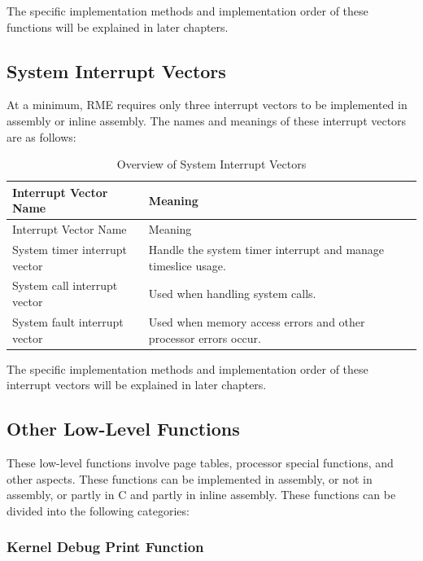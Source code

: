The specific implementation methods and implementation order of these functions will be explained in later chapters.

\subsection{System Interrupt Vectors}\label{subsec:7-system-interrupt-vectors}

At a minimum, RME requires only three interrupt vectors to be implemented in assembly or inline assembly. The names and meanings of these interrupt vectors are as follows:

\begin{xltabular}{\textwidth}{@{}>{\hsize\raggedright\arraybackslash}X>{\hsize\raggedright\arraybackslash}X@{}}
\caption{Overview of System Interrupt Vectors}\label{tab:7-7-system-interrupt-vectors-overview}\\
\toprule
Interrupt Vector Name & Meaning\tabularnewline
\endfirsthead
\toprule
Interrupt Vector Name & Meaning\tabularnewline
\midrule
\endhead
\bottomrule
\endlastfoot
System timer interrupt vector & Handle the system timer interrupt and manage timeslice usage.\tabularnewline
System call interrupt vector & Used when handling system calls.\tabularnewline
System fault interrupt vector & Used when memory access errors and other processor errors occur.\tabularnewline
\end{xltabular}
\nopagebreak[4]

The specific implementation methods and implementation order of these interrupt vectors will be explained in later chapters.

\subsection{Other Low-Level Functions}\label{subsec:7-other-low-level-functions}

These low-level functions involve page tables, processor special functions, and other aspects. These functions can be implemented in assembly, or not in assembly, or partly in C and partly in inline assembly. These functions can be divided into the following categories:

\subsubsection{Kernel Debug Print Function}\label{subsubsec:7-kernel-debug-print-function}

